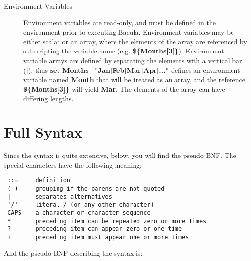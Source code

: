 \begin{description}
\item [Environment Variables]
   Environment variables are read-only,  and must be defined in the environment
prior to executing Bacula.  Environment variables may be either scalar or an
array, where the  elements of the array are referenced by subscripting the
variable  name (e.g. {\bf \$\{Months[3]\}}). Environment variable arrays are
defined by separating the elements with a vertical bar ({\bf |}),  thus {\bf
set Months="Jan|Feb|Mar|Apr|..."} defines  an environment variable named
{\bf Month} that will be  treated as an array, and the reference {\bf
\$\{Months[3]\}} will  yield {\bf Mar}. The elements of the array can have
differing lengths.
\end{description}

\section{Full Syntax}

Since the syntax is quite extensive, below, you will find the pseudo BNF. The
special characters have the following meaning:

\footnotesize
\begin{verbatim}
 ::=     definition
 ( )     grouping if the parens are not quoted
 |       separates alternatives
 '/'     literal / (or any other character)
 CAPS    a character or character sequence
 *       preceding item can be repeated zero or more times
 ?       preceding item can appear zero or one time
 +       preceding item must appear one or more times
\end{verbatim}
\normalsize

And the pseudo BNF describing the syntax is:


